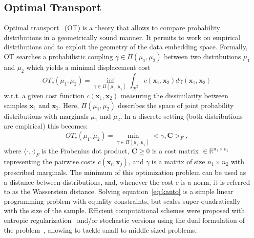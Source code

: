 \documentclass[runningheads]{llncs}
\begin{document}
\subsection{Optimal Transport}
Optimal transport~\cite{Villani09} (OT) is a theory that allows to compare probability distributions in a geometrically sound manner. It permits to work on empirical distributions and to exploit the geometry of the data embedding space. Formally, OT searches a probabilistic coupling $\gamma \in \Pi(\mu_1,\mu_2)$ between two distributions $\mu_1$ and $\mu_2$ which yields a minimal displacement cost 
  \begin{equation}
 OT_c(\mu_1,\mu_2) = \inf_{\gamma\in \Pi(\mu_1,\mu_2)} \int_{\mathcal{R}^2} c(\mathbf{x}_1,\mathbf{x}_2)d \gamma(\mathbf{x}_1,\mathbf{x}_2)
 \end{equation}
w.r.t. a given cost function $c(\mathbf{x}_1,\mathbf{x}_2)$ measuring the dissimilarity between samples $\mathbf{x}_1$ and $\mathbf{x}_2$. Here, $\Pi(\mu_1,\mu_2)$ describes the
space of joint probability distribution{s} with marginals $\mu_1$ and $\mu_2$. In a discrete setting (both distributions are empirical) this becomes:
 \begin{equation}
 OT_c(\mu_1,\mu_2) = \min_{\gamma \in \Pi(\mu_1,\mu_2)}  <\gamma, \mathbf{C}>_F,
 \label{eq:kanto}
 \end{equation}
 where $\langle\cdot, \cdot\rangle_F$ is the Frobenius dot product, $\mathbf{C} \geq 0$ is a cost matrix $\in \mathbb{R}^{n_1\times n_2}$ representing the pairwise costs $c(\mathbf{x}_i,\mathbf{x}_j)$, and $\gamma$ is a matrix of size $n_1\times n_2$ with prescribed marginals. The minimum of this optimization problem can be used as a distance between distributions, and, whenever the cost $c$ is a norm, it is referred to as the Wasserstein distance. Solving equation~\eqref{eq:kanto} is a simple linear programming problem with equality constraints, but scales super-quadratically with the size of the sample. Efficient computational schemes were proposed with entropic regularization~\cite{Cuturi13} and/or stochastic versions using the dual formulation of the problem~\cite{genevay2016,arjovsky17,seguy2018}, allowing to tackle small to middle sized problems. 
\end{document}
